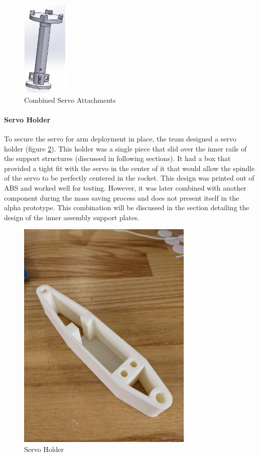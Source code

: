 \begin{figure}[H]
    \centering
    \includegraphics[width=0.2\textwidth]{src/figs/combinedattach.png}
    \caption{Combined Servo Attachments}
    \label{fig:combined attachments}
\end{figure}

\paragraph{Servo Holder}
To secure the servo for arm deployment in place, the team designed a servo holder (figure \ref{fig:SH}). This holder was a single piece that slid over the inner rails of the support structures (discussed in following sections). It had a box that provided a tight fit with the servo in the center of it that would allow the spindle of the servo to be perfectly centered in the rocket. This design was printed out of ABS and worked well for testing. However, it was later combined with another component during the mass saving process and does not present itself in the alpha prototype. This combination will be discussed in the section detailing the design of the inner assembly support plates.

\begin{figure}[H]
    \centering
    \includegraphics[width=0.75\textwidth]{src/figs/ServoHolder.jpg}
    \caption{Servo Holder}
    \label{fig:SH}
\end{figure}



